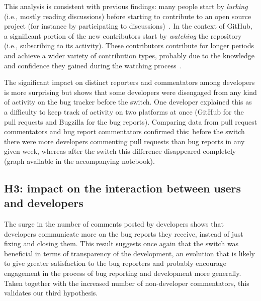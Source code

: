 \documentclass[conference]{IEEEtran}
\begin{document}
This analysis is consistent with previous findings: many people start by \emph{lurking} (i.e., mostly reading discussions) before starting to contribute to an open source project (for instance by participating to discussions)~\cite{von2003community}. In the context of GitHub, a significant portion of the new contributors start by \emph{watching} the repository (i.e., subscribing to its activity). These contributors contribute for longer periods and achieve a wider variety of contribution types, probably due to the knowledge and confidence they gained during the watching process~\cite{sheoran2014understanding}.


The significant impact on distinct reporters and commentators among developers is more surprising but shows that some developers were disengaged from any kind of activity on the bug tracker before the switch. One developer explained this as a difficulty to keep track of activity on two platforms at once (GitHub for the pull requests and Bugzilla for the bug reports). Comparing data from pull request commentators and bug report commentators confirmed this: before the switch there were more developers commenting pull requests than bug reports in any given week, whereas after the switch this difference disappeared completely (graph available in the accompanying notebook).


\subsection{H3: impact on the interaction between users and developers}

The surge in the number of comments posted by developers shows that developers communicate more on the bug reports they receive, instead of just fixing and closing them. This result suggests once again that the switch was beneficial in terms of transparency of the development, an evolution that is likely to give greater satisfaction to the bug reporters and probably encourage engagement in the process of bug reporting and development more generally. Taken together with the increased number of non-developer commentators, this validates our third hypothesis.
\end{document}
